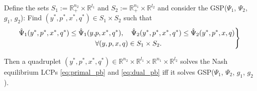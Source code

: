 \documentclass[envcountsame]{llncs} %
\begin{document}
\begin{theorem}
Define the sets $S_1 := \mathbb{R}^{n_2}_+ \times \mathbb{R}^{l_1}$ and $S_2 :=
\mathbb{R}^{n_1}_+ \times \mathbb{R}^{l_2}$ and consider the
GSP($\Psi_1$, $\Psi_2$, $g_1$, $g_2$): Find $(y^*,p^*, x^*, q^*) \in
S_1 \times S_2$ such that
\begin{eqnarray}
  \left.
  \begin{aligned}
    \hat{\Psi}_1(y^*, p^*, x^*, q^*) \le \hat{\Psi}_1(y, &p, x^*,
    q^*),\hspace{.5em} \hspace{.5em}\hat{\Psi}_2(y^*, p^*, x^*, q^*)
    \le \hat{\Psi}_2(y^*, p^*, x, q)\\
    &\forall (y,p, x, q) \in S_1 \times S_2.
  \end{aligned}
  \right\}
  \label{eq:unconstrained_pb}
\end{eqnarray}
\label{thm:pd}

Then a quadruplet $(y^*,p^*, x^*, q^*) \in \mathbb{R}^{n_2}
  \times \mathbb{R}^{l_1} \times \mathbb{R}^{n_1} \times
  \mathbb{R}^{l_2}$ solves the Nash equilibrium LCPs
  \eqref{eq:primal_pb} and \eqref{eq:dual_pb} iff it solves
  GSP($\Psi_1$, $\Psi_2$, $g_1$, $g_2$).
  \label{thm:pd}
\end{theorem}
\end{document}
